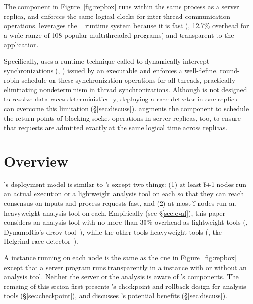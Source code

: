 The \dmt component in Figure~\ref{fig:repbox} runs within the same process as a server replica, and
enforces the same logical clocks for inter-thread communication
operations. \repbox leverages the \parrot~\cite{parrot:sosp13} \dmt runtime
system because it is fast (\ie, 12.7\% overhead for a wide range of 108 popular 
multithreaded programs) and transparent to the application.


Specifically, \parrot uses a runtime technique called \ldpreload to dynamically 
intercept \pthread synchronizations (\eg, \mutexlock) issued by an executable 
and enforces a well-define, round-robin schedule on these synchronization 
operations for all threads, practically eliminating nondeterminism in thread
synchronizations. Although \parrot is not designed to resolve data races
deterministically, deploying a race detector in one replica can overcome this 
limitation (\S\ref{sec:discuss}).  \repbox augments the \dmt component to schedule 
the return points of blocking socket operations in server replicas, too, to 
ensure that requests are admitted exactly at the same logical time across 
replicas.



\section{\xxx Overview} \label{sec:overview}

\xxx's deployment model is similar to \repbox's except two things: (1) at least \v{f}+1 nodes 
run an actual execution or a lightweight analysis tool on 
each so that they can reach consensus on inputs and process requests fast, and 
(2) at most \v{f} nodes run an heavyweight analysis tool on each. Empirically 
(see \S\ref{sec:eval}), this paper considers an analysis tool with no more than 30\% overhead as 
lightweight tools (\eg, DynamoRio's drcov tool~\cite{dynamorio}), while the other tools heavyweight 
tools (\eg, the Helgrind race detector~\cite{valgrind:pldi}).

A \xxx instance running on each node is the same as the one in 
Figure~\ref{fig:repbox} except that a server program runs transparently in a \xxx instance 
with or without an analysis tool. Neither the server or the analysis is aware of \xxx's 
components. The remaing of this secion first presents \xxx's checkpoint and 
rollback design for analysis tools (\S\ref{sec:checkpoint}), and discusses \xxx's potential 
benefits (\S\ref{sec:discuss}).

